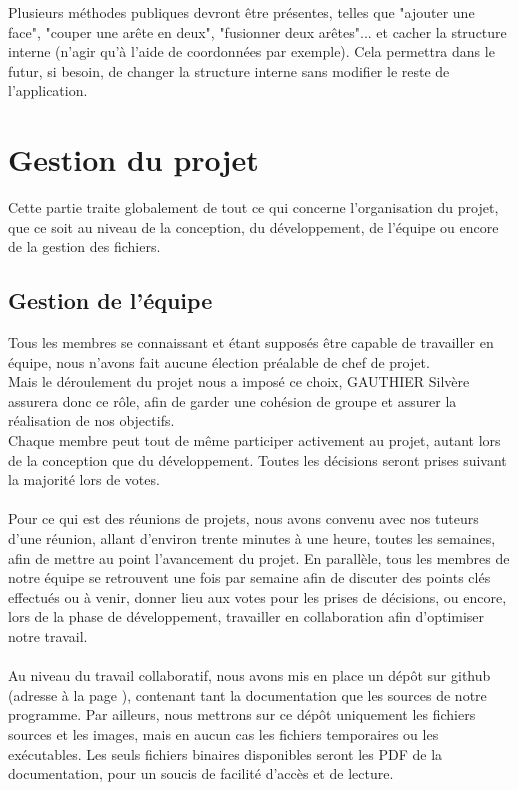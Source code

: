 \documentclass[a4paper]{memoir}
\begin{document}
				Plusieurs méthodes publiques devront être présentes, telles que "ajouter une face", "couper une arête en deux", "fusionner deux arêtes"... 
				et cacher la structure interne (n'agir qu'à l'aide de coordonnées par exemple). Cela permettra dans le futur, si besoin, de changer la 
				structure interne sans modifier le reste de l'application.
		
	\chapter{Gestion du projet}
		Cette partie traite globalement de tout ce qui concerne l'organisation du projet, que ce soit au niveau de la conception, du développement, de 
		l'équipe ou encore de la gestion des fichiers.
		
		\section{Gestion de l'équipe}
			Tous les membres se connaissant et étant supposés être capable de travailler en équipe, nous n'avons fait aucune élection préalable de chef de 
			projet.\\ Mais le déroulement du projet nous a imposé ce choix, GAUTHIER Silvère assurera donc ce rôle, afin de garder une cohésion de groupe 
			et assurer la réalisation de nos objectifs.\\ Chaque membre peut tout de même participer activement au projet, autant lors de la conception que 
			du développement. Toutes les décisions seront prises suivant la majorité lors de votes.\\\\
			Pour ce qui est des réunions de projets, nous avons convenu avec nos tuteurs d'une réunion, allant d'environ trente minutes à une heure, toutes 
			les semaines, afin de mettre au point l'avancement du projet. En parallèle, tous les membres de notre équipe se retrouvent une fois par semaine 
			afin de discuter des points clés effectués ou à venir, donner lieu aux votes pour les prises de décisions, ou encore, lors de la phase de 
			développement, travailler en collaboration afin d'optimiser notre travail.\\\\
			Au niveau du travail collaboratif, nous avons mis en place un dépôt sur github (adresse à la page \pageref{url:github}), contenant tant la 
			documentation que les sources de notre programme. Par ailleurs, nous mettrons sur ce dépôt uniquement les fichiers sources et les images, mais 
			en aucun cas les fichiers temporaires ou les exécutables. Les seuls fichiers binaires disponibles seront les PDF de la documentation, pour un 
			soucis de facilité d'accès et de lecture.
\end{document}
